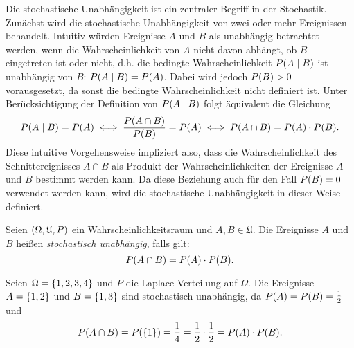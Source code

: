 \documentclass{lecture}
\begin{document}
    Die stochastische Unabhängigkeit ist ein zentraler Begriff in der Stochastik.
    Zunächst wird die stochastische Unabhängigkeit von zwei oder mehr Ereignissen behandelt.
    Intuitiv würden Ereignisse \(A\) und \(B\) als unabhängig betrachtet werden, wenn die Wahrscheinlichkeit von \(A\) nicht davon abhängt, ob \(B\) eingetreten ist oder nicht, d.h. die bedingte Wahrscheinlichkeit \(P\parentheses*{A \mid B}\) ist unabhängig von \(B\): \(P\parentheses*{A \mid B} = P\parentheses*{A}\).
    Dabei wird jedoch \(P\parentheses*{B} > 0\) vorausgesetzt, da sonst die bedingte Wahrscheinlichkeit nicht definiert ist.
    Unter Berücksichtigung der Definition von \(P\parentheses*{A \mid B}\) folgt äquivalent die Gleichung
    \[
        P\parentheses*{A \mid B} = P\parentheses*{A} \iff \frac{P\parentheses*{A \cap B}}{P\parentheses*{B}} = P\parentheses*{A} \iff P\parentheses*{A \cap B} = P\parentheses*{A} \cdot P\parentheses*{B}.
    \]
    Diese intuitive Vorgehensweise impliziert also, dass die Wahrscheinlichkeit des Schnittereignisses \(A \cap B\) als Produkt der Wahrscheinlichkeiten der Ereignisse \(A\) und \(B\) bestimmt werden kann.
    Da diese Beziehung auch für den Fall \(P\parentheses*{B} = 0\) verwendet werden kann, wird die stochastische Unabhängigkeit in dieser Weise definiert.

    \begin{definition}
        Seien \(\parentheses*{\Omega, \mathfrak{U}, P}\) ein Wahrscheinlichkeitsraum und \(A, B \in \mathfrak{U}\).
        Die Ereignisse \(A\) und \(B\) heißen \emph{stochastisch unabhängig}, falls gilt:
        \[
            P\parentheses*{A \cap B} = P\parentheses*{A} \cdot P\parentheses*{B}.
        \]
    \end{definition}

    \begin{example}
        Seien \(\Omega = \braces*{1, 2, 3, 4}\) und \(P\) die Laplace-Verteilung auf \(\Omega\).
        Die Ereignisse \(A = \braces*{1, 2}\) und \(B = \braces*{1, 3}\) sind stochastisch unabhängig, da \(P\parentheses*{A} = P\parentheses*{B} = \frac{1}{2}\) und
        \[
            P\parentheses*{A \cap B} = P\parentheses*{\braces*{1}} = \frac{1}{4} = \frac{1}{2} \cdot \frac{1}{2} = P\parentheses*{A} \cdot P\parentheses*{B}.
        \]
    \end{example}
\end{document}
